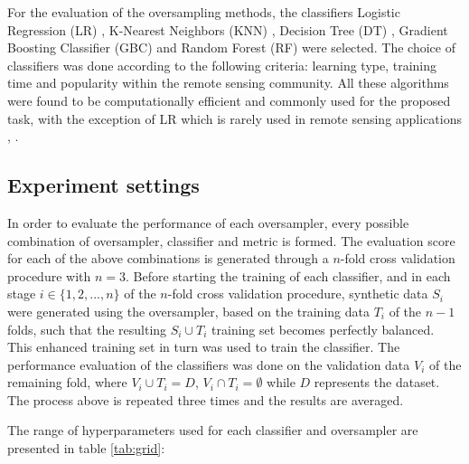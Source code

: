 \documentclass[remotesensing,article,submit,moreauthors,pdftex]{Definitions/mdpi}
\begin{document}
For the evaluation of the oversampling methods, the classifiers Logistic
Regression (LR) \cite{McCullagh1989}, K-Nearest Neighbors (KNN)
\cite{Cover1967}, Decision Tree (DT) \cite{Salzberg1994}, Gradient
Boosting Classifier (GBC) \cite{Friedman2001} and Random Forest (RF)
\cite{Liaw2002} were selected. The choice of classifiers was done according
to the following criteria: learning type, training time and popularity within
the remote sensing community. All these algorithms were found to be
computationally efficient and commonly used for the proposed task, with the
exception of LR which is rarely used in remote sensing applications
\cite{Khatami2016}, \cite{Maxwell2018}.

\subsection{Experiment settings}

In order to evaluate the performance of each oversampler, every possible
combination of oversampler, classifier and metric is formed. The evaluation
score for each of the above combinations is generated through a \( n \)-fold
cross validation procedure with \( n = 3 \). Before starting the training of
each classifier, and in each stage \(i \in \{1, 2 ,... , n \} \) of the \( n
\)-fold cross validation procedure, synthetic data \( S_{i} \) were generated
using the oversampler, based on the training data \(T_{i} \) of the \( n - 1 \)
folds, such that the resulting \(S_{i} \cup T_{i} \) training set becomes
perfectly balanced. This enhanced training set in turn was used to train the
classifier. The performance evaluation of the classifiers was done on the
validation data \( V_{i} \) of the remaining fold, where \(V_{i} \cup T_{i} = D
\), \(V_{i} \cap T_{i} = \emptyset \) while \( D \) represents the dataset. The
process above is repeated three times and the results are averaged.

The range of hyperparameters used for each classifier and oversampler are
presented in table \ref{tab:grid}:
\end{document}
